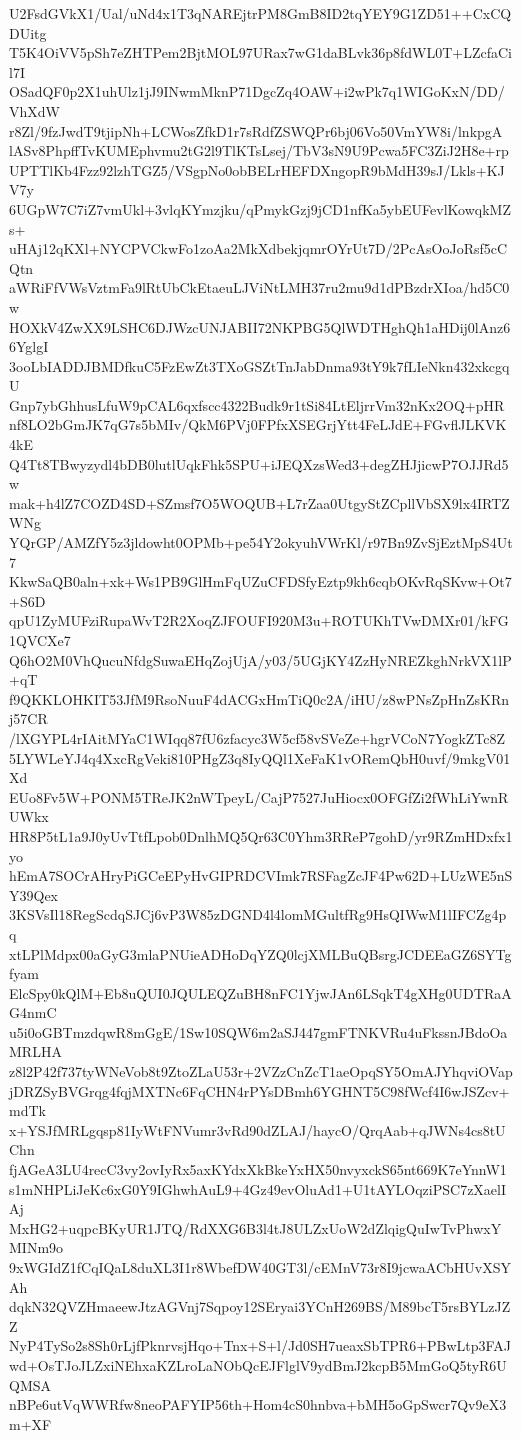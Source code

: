 U2FsdGVkX1/Ual/uNd4x1T3qNAREjtrPM8GmB8ID2tqYEY9G1ZD51++CxCQDUitg
T5K4OiVV5pSh7eZHTPem2BjtMOL97URax7wG1daBLvk36p8fdWL0T+LZcfaCil7I
OSadQF0p2X1uhUlz1jJ9INwmMknP71DgcZq4OAW+i2wPk7q1WIGoKxN/DD/VhXdW
r8Zl/9fzJwdT9tjipNh+LCWosZfkD1r7sRdfZSWQPr6bj06Vo50VmYW8i/lnkpgA
lASv8PhpffTvKUMEphvmu2tG2l9TlKTsLsej/TbV3sN9U9Pcwa5FC3ZiJ2H8e+rp
UPTTlKb4Fzz92lzhTGZ5/VSgpNo0obBELrHEFDXngopR9bMdH39sJ/Lkls+KJV7y
6UGpW7C7iZ7vmUkl+3vlqKYmzjku/qPmykGzj9jCD1nfKa5ybEUFevlKowqkMZs+
uHAj12qKXl+NYCPVCkwFo1zoAa2MkXdbekjqmrOYrUt7D/2PcAsOoJoRsf5cCQtn
aWRiFfVWsVztmFa9lRtUbCkEtaeuLJViNtLMH37ru2mu9d1dPBzdrXIoa/hd5C0w
HOXkV4ZwXX9LSHC6DJWzcUNJABII72NKPBG5QlWDTHghQh1aHDij0lAnz66YglgI
3ooLbIADDJBMDfkuC5FzEwZt3TXoGSZtTnJabDnma93tY9k7fLIeNkn432xkcgqU
Gnp7ybGhhusLfuW9pCAL6qxfscc4322Budk9r1tSi84LtEljrrVm32nKx2OQ+pHR
nf8LO2bGmJK7qG7s5bMIv/QkM6PVj0FPfxXSEGrjYtt4FeLJdE+FGvflJLKVK4kE
Q4Tt8TBwyzydl4bDB0lutlUqkFhk5SPU+iJEQXzsWed3+degZHJjicwP7OJJRd5w
mak+h4lZ7COZD4SD+SZmsf7O5WOQUB+L7rZaa0UtgyStZCpllVbSX9lx4IRTZWNg
YQrGP/AMZfY5z3jldowht0OPMb+pe54Y2okyuhVWrKl/r97Bn9ZvSjEztMpS4Ut7
KkwSaQB0aln+xk+Ws1PB9GlHmFqUZuCFDSfyEztp9kh6cqbOKvRqSKvw+Ot7+S6D
qpU1ZyMUFziRupaWvT2R2XoqZJFOUFI920M3u+ROTUKhTVwDMXr01/kFG1QVCXe7
Q6hO2M0VhQucuNfdgSuwaEHqZojUjA/y03/5UGjKY4ZzHyNREZkghNrkVX1lP+qT
f9QKKLOHKIT53JfM9RsoNuuF4dACGxHmTiQ0c2A/iHU/z8wPNsZpHnZsKRnj57CR
/lXGYPL4rIAitMYaC1WIqq87fU6zfacyc3W5cf58vSVeZe+hgrVCoN7YogkZTc8Z
5LYWLeYJ4q4XxcRgVeki810PHgZ3q8IyQQl1XeFaK1vORemQbH0uvf/9mkgV01Xd
EUo8Fv5W+PONM5TReJK2nWTpeyL/CajP7527JuHiocx0OFGfZi2fWhLiYwnRUWkx
HR8P5tL1a9J0yUvTtfLpob0DnlhMQ5Qr63C0Yhm3RReP7gohD/yr9RZmHDxfx1yo
hEmA7SOCrAHryPiGCeEPyHvGIPRDCVImk7RSFagZcJF4Pw62D+LUzWE5nSY39Qex
3KSVsIl18RegScdqSJCj6vP3W85zDGND4l4lomMGultfRg9HsQIWwM1lIFCZg4pq
xtLPlMdpx00aGyG3mlaPNUieADHoDqYZQ0lcjXMLBuQBsrgJCDEEaGZ6SYTgfyam
ElcSpy0kQlM+Eb8uQUI0JQULEQZuBH8nFC1YjwJAn6LSqkT4gXHg0UDTRaAG4nmC
u5i0oGBTmzdqwR8mGgE/1Sw10SQW6m2aSJ447gmFTNKVRu4uFkssnJBdoOaMRLHA
z8l2P42f737tyWNeVob8t9ZtoZLaU53r+2VZzCnZcT1aeOpqSY5OmAJYhqviOVap
jDRZSyBVGrqg4fqjMXTNc6FqCHN4rPYsDBmh6YGHNT5C98fWcf4I6wJSZcv+mdTk
x+YSJfMRLgqsp81IyWtFNVumr3vRd90dZLAJ/haycO/QrqAab+qJWNs4cs8tUChn
fjAGeA3LU4recC3vy2ovIyRx5axKYdxXkBkeYxHX50nvyxckS65nt669K7eYnnW1
s1mNHPLiJeKc6xG0Y9IGhwhAuL9+4Gz49evOluAd1+U1tAYLOqziPSC7zXaelIAj
MxHG2+uqpcBKyUR1JTQ/RdXXG6B3l4tJ8ULZxUoW2dZlqigQuIwTvPhwxYMINm9o
9xWGIdZ1fCqIQaL8duXL3I1r8WbefDW40GT3l/cEMnV73r8I9jcwaACbHUvXSYAh
dqkN32QVZHmaeewJtzAGVnj7Sqpoy12SEryai3YCnH269BS/M89bcT5rsBYLzJZZ
NyP4TySo2s8Sh0rLjfPknrvsjHqo+Tnx+S+l/Jd0SH7ueaxSbTPR6+PBwLtp3FAJ
wd+OsTJoJLZxiNEhxaKZLroLaNObQcEJFlglV9ydBmJ2kcpB5MmGoQ5tyR6UQMSA
nBPe6utVqWWRfw8neoPAFYIP56th+Hom4cS0hnbva+bMH5oGpSwcr7Qv9eX3m+XF
